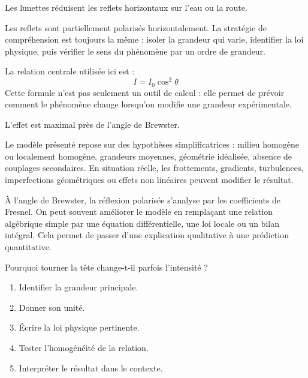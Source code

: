 \documentclass[11pt,a4paper]{article}
\begin{document}
\begin{exemplebox}
Les lunettes réduisent les reflets horizontaux sur l'eau ou la route.
\end{exemplebox}

\begin{methodebox}
Les reflets sont partiellement polarisés horizontalement.
La stratégie de compréhension est toujours la même : isoler la grandeur qui varie, identifier la loi physique, puis vérifier le sens du phénomène par un ordre de grandeur.
\end{methodebox}

\begin{theorembox}
La relation centrale utilisée ici est :
\[
I=I_0\cos^2\theta
\]
Cette formule n'est pas seulement un outil de calcul : elle permet de prévoir comment le phénomène change lorsqu'on modifie une grandeur expérimentale.
\end{theorembox}

\begin{odgbox}
L'effet est maximal près de l'angle de Brewster.
\end{odgbox}

\begin{attentionbox}
Le modèle présenté repose sur des hypothèses simplificatrices : milieu homogène ou localement homogène, grandeurs moyennes, géométrie idéalisée, absence de couplages secondaires. En situation réelle, les frottements, gradients, turbulences, imperfections géométriques ou effets non linéaires peuvent modifier le résultat.
\end{attentionbox}

\begin{approfondissementbox}
À l'angle de Brewster, la réflexion polarisée s'analyse par les coefficients de Fresnel.
On peut souvent améliorer le modèle en remplaçant une relation algébrique simple par une équation différentielle, une loi locale ou un bilan intégral. Cela permet de passer d'une explication qualitative à une prédiction quantitative.
\end{approfondissementbox}

\begin{exercicebox}
Pourquoi tourner la tête change-t-il parfois l'intensité ?
\begin{enumerate}
  \item Identifier la grandeur principale.
  \item Donner son unité.
  \item Écrire la loi physique pertinente.
  \item Tester l'homogénéité de la relation.
  \item Interpréter le résultat dans le contexte.
\end{enumerate}
\end{exercicebox}
\end{document}
